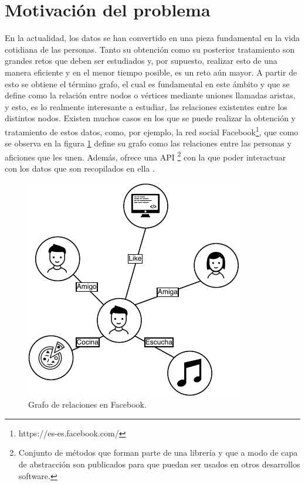 \section{Motivación del problema}

En la actualidad, los datos se han convertido en una pieza fundamental en la vida cotidiana de las personas. Tanto su obtención como su posterior tratamiento son grandes retos que deben ser estudiados y, por supuesto, realizar esto de una manera eficiente y en el menor tiempo posible, es un reto aún mayor. A partir de esto se obtiene el término grafo, el cual es fundamental en este ámbito y que se define como la relación entre nodos o vértices mediante uniones llamadas aristas, y esto, es lo realmente interesante a estudiar, las relaciones existentes entre los distintos nodos.\newline
Existen muchos casos en los que se puede realizar la obtención y tratamiento de estos datos, como, por ejemplo, la red social Facebook\footnote{https://es-es.facebook.com/}, que como se observa en la figura \ref{fig:facebook-graph} define su grafo como las relaciones entre las personas y aficiones que les unen. Además, ofrece una \gls{API} \footnote{Conjunto de métodos que forman parte de una librería y que a modo de capa de abstracción son publicados para que puedan ser usados en otros desarrollos software.} con la que poder interactuar con los datos que son recopilados en ella \cite{api-graph}.

 \begin{figure}[H]
	\centering
	\includegraphics[scale=0.8]{Figures/facebook-graph.pdf}
	\caption{Grafo de relaciones en Facebook.}
	\label{fig:facebook-graph}
\end{figure}

